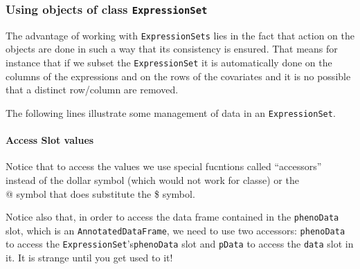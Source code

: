 \documentclass[a4paper]{article}\usepackage[]{graphicx}\usepackage[]{color}
\begin{document}
\subsubsection{Using objects of class \texttt{ExpressionSet}}

The advantage of working with \texttt{ExpressionSets} lies in the fact that action on the objects are done in such a way that its consistency is ensured. That means for instance that if we subset the \texttt{ExpressionSet} it is automatically done on the columns of the expressions and on the rows of the covariates and it is no possible that a distinct row/column are removed.

The following lines illustrate some management of data in an \texttt{ExpressionSet}.

\paragraph{Access Slot values}

 Notice that to access the values we use special fucntions called ``accessors'' instead of the dollar symbol (which would not work for classe) or the \\@ symbol that does substitute the  \$ symbol.
 
 Notice also that, in order to access the data frame contained in the \texttt{phenoData} slot, which is an \texttt{AnnotatedDataFrame}, we need to use two accessors: \texttt{phenoData} to access the \texttt{ExpressionSet}'s\texttt{phenoData} slot and \texttt{pData} to access the \texttt{data} slot in it. It is strange until you get used to it!
\end{document}
